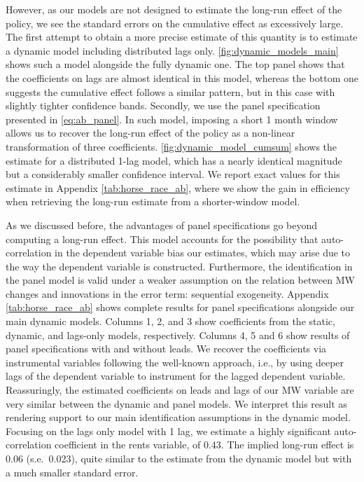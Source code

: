However, as our models are not designed to estimate the long-run effect of the policy, we see 
the standard errors on the cumulative effect as excessively large. The first attempt to obtain 
a more precise estimate of this quantity is to estimate a dynamic model including distributed 
lags only. \autoref{fig:dynamic_models_main} shows such a model alongside the fully dynamic one. 
The top panel shows that the coefficients on lags are almost identical in this model, whereas 
the bottom one suggests the cumulative effect follows a similar pattern, but in this case with 
slightly tighter confidence bands. Secondly, we use the panel specification presented in 
\autoref{eq:ab_panel}. In such model, imposing a short 1 month window allows us to recover 
the long-run effect of the policy as a non-linear transformation of three coefficients. 
\autoref{fig:dynamic_model_cumsum} shows the estimate for a distributed 1-lag model, 
which has a nearly identical magnitude but a considerably smaller confidence interval. We report 
exact values for this estimate in Appendix \autoref{tab:horse_race_ab}, where we show the gain 
in efficiency when retrieving the long-run estimate from a shorter-window model. 

As we discussed before, the advantages of panel specifications go beyond computing a long-run 
effect. This model accounts for the possibility that auto-correlation in the dependent variable 
bias our estimates, which may arise due to the way the dependent variable is constructed. 
Furthermore, the identification in the panel model is valid under a weaker assumption on the 
relation between MW changes and innovations in the error term: sequential exogeneity. Appendix 
\autoref{tab:horse_race_ab} shows complete results for panel specifications alongside our main 
dynamic models. Columns 1, 2, and 3 show coefficients from the static, dynamic, and lags-only 
models, respectively. Columns 4, 5 and 6 show results of panel specifications with and without 
leads. We recover the coefficients via instrumental variables following the well-known 
\textcite{ArellanoBond1991} approach, i.e., by using deeper lags of the dependent variable to 
instrument for the lagged dependent variable. Reassuringly, the estimated coefficients on leads 
and lags of our MW variable are very similar between the dynamic and panel models. We interpret 
this result as rendering support to our main identification assumptions in the dynamic model. 
Focusing on the lags only model with 1 lag, we estimate a highly significant auto-correlation 
coefficient in the rents variable, of 0.43. The implied long-run effect is 0.06 (s.e.\ 0.023), 
quite similar to the estimate from the dynamic model but with a much smaller standard error.


